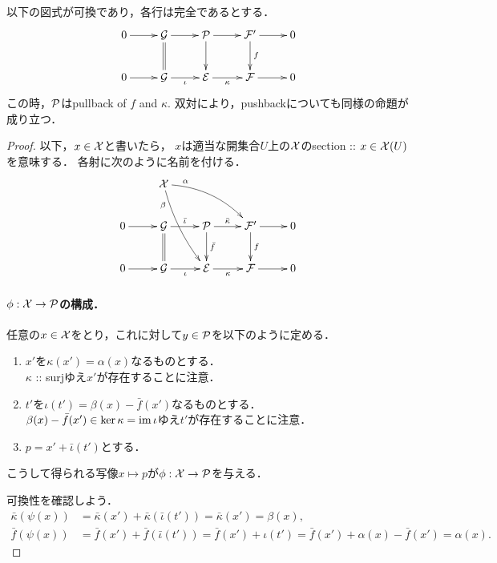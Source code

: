 \documentclass[a4paper]{jsarticle}
\begin{document}
    \begin{Lemma}\label{lemma:two_exact_seq_raise_pb}
        以下の図式が可換であり，各行は完全であるとする．
        \[\vcenter{\xymatrix{
            0 \ar[r]& \shG \ar@{=}[d]\ar[r]& \shP \ar[d]\ar[r]& \shF' \ar[d]^-{f}\ar[r]& 0 \\
            0 \ar[r]& \shG \ar[r]_-{\iota}& \shE \ar[r]_-{\kappa}& \shF \ar[r]& 0
        }}\]
        この時，$\mathcal{P}$はpullback of $f$ and $\kappa$.
        双対により，pushbackについても同様の命題が成り立つ．
    \end{Lemma}
    \begin{proof}
        以下，$x \in \mathcal{X}$と書いたら，
        $x$は適当な開集合$U$上の$\mathcal{X}$のsection :: $x \in \mathcal{X}(U)$を意味する．
        各射に次のように名前を付ける．
        \[\vcenter{\xymatrix{
            {} & \shX \ar@/^10pt/[rrd]^(.2){\alpha}\ar@/_5pt/[rdd]_(.2){\beta}& {} & {} & {} \\
            0 \ar[r]& \shG \ar@{=}[d]\ar[r]^-{\bar{\iota}}& \shP \ar[d]^-{\bar{f}}\ar[r]^-{\bar{\kappa}}& \shF' \ar[d]^-{f}\ar[r]& 0 \\
            0 \ar[r]& \shG \ar[r]_-{\iota}& \shE \ar[r]_-{\kappa}& \shF \ar[r]& 0
        }}\]

        \paragraph{$\phi: \mathcal{X} \to \mathcal{P}$の構成．}
        任意の$x \in \mathcal{X}$をとり，これに対して$y \in \mathcal{P}$を以下のように定める．
        \begin{enumerate}[labelindent=1cm, leftmargin=*]
            \item $x'$を$\kappa(x')=\alpha(x)$なるものとする．\mbox{} \\
                  $\kappa$ :: surjゆえ$x'$が存在することに注意．
              \item $t'$を$\iota(t')=\beta(x)-\bar{f}(x')$なるものとする． \mbox{} \\
                  $\beta(x)-\bar{f}(x')\in \ker \kappa=\operatorname{im} \iota$ゆえ$t'$が存在することに注意．
            \item $p=x'+\bar{\iota}(t')$とする．
        \end{enumerate}
        こうして得られる写像$x \mapsto p$が$\phi: \mathcal{X} \to \mathcal{P}$を与える．

        可換性を確認しよう．
        \begin{align*}
            \bar{\kappa}(\psi(x))&=\bar{\kappa}(x')+\bar{\kappa}(\bar{\iota}(t'))=\bar{\kappa}(x')=\beta(x), \\
            \bar{f}(\psi(x))&=\bar{f}(x')+\bar{f}(\bar{\iota}(t'))
                =\bar{f}(x')+\iota(t')=\bar{f}(x')+\alpha(x)-\bar{f}(x')=\alpha(x).
        \end{align*}


\end{proof}
\end{document}
